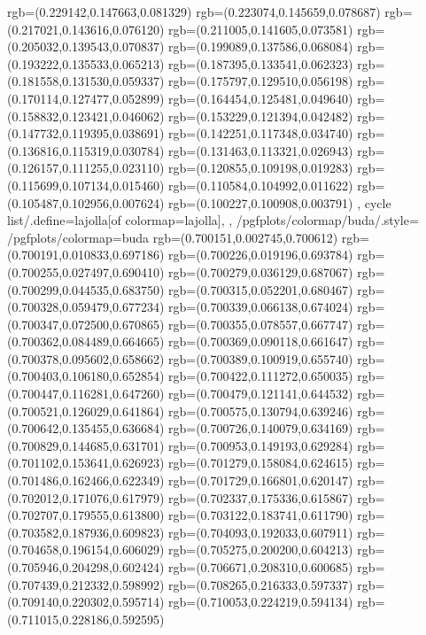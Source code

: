{{{			rgb=(0.229142,0.147663,0.081329)
			rgb=(0.223074,0.145659,0.078687)
			rgb=(0.217021,0.143616,0.076120)
			rgb=(0.211005,0.141605,0.073581)
			rgb=(0.205032,0.139543,0.070837)
			rgb=(0.199089,0.137586,0.068084)
			rgb=(0.193222,0.135533,0.065213)
			rgb=(0.187395,0.133541,0.062323)
			rgb=(0.181558,0.131530,0.059337)
			rgb=(0.175797,0.129510,0.056198)
			rgb=(0.170114,0.127477,0.052899)
			rgb=(0.164454,0.125481,0.049640)
			rgb=(0.158832,0.123421,0.046062)
			rgb=(0.153229,0.121394,0.042482)
			rgb=(0.147732,0.119395,0.038691)
			rgb=(0.142251,0.117348,0.034740)
			rgb=(0.136816,0.115319,0.030784)
			rgb=(0.131463,0.113321,0.026943)
			rgb=(0.126157,0.111255,0.023110)
			rgb=(0.120855,0.109198,0.019283)
			rgb=(0.115699,0.107134,0.015460)
			rgb=(0.110584,0.104992,0.011622)
			rgb=(0.105487,0.102956,0.007624)
			rgb=(0.100227,0.100908,0.003791)
		},
	cycle list/.define={lajolla}{[of colormap=lajolla]},
	},
	/pgfplots/colormap/buda/.style={
		/pgfplots/colormap={buda}{%
			rgb=(0.700151,0.002745,0.700612)
			rgb=(0.700191,0.010833,0.697186)
			rgb=(0.700226,0.019196,0.693784)
			rgb=(0.700255,0.027497,0.690410)
			rgb=(0.700279,0.036129,0.687067)
			rgb=(0.700299,0.044535,0.683750)
			rgb=(0.700315,0.052201,0.680467)
			rgb=(0.700328,0.059479,0.677234)
			rgb=(0.700339,0.066138,0.674024)
			rgb=(0.700347,0.072500,0.670865)
			rgb=(0.700355,0.078557,0.667747)
			rgb=(0.700362,0.084489,0.664665)
			rgb=(0.700369,0.090118,0.661647)
			rgb=(0.700378,0.095602,0.658662)
			rgb=(0.700389,0.100919,0.655740)
			rgb=(0.700403,0.106180,0.652854)
			rgb=(0.700422,0.111272,0.650035)
			rgb=(0.700447,0.116281,0.647260)
			rgb=(0.700479,0.121141,0.644532)
			rgb=(0.700521,0.126029,0.641864)
			rgb=(0.700575,0.130794,0.639246)
			rgb=(0.700642,0.135455,0.636684)
			rgb=(0.700726,0.140079,0.634169)
			rgb=(0.700829,0.144685,0.631701)
			rgb=(0.700953,0.149193,0.629284)
			rgb=(0.701102,0.153641,0.626923)
			rgb=(0.701279,0.158084,0.624615)
			rgb=(0.701486,0.162466,0.622349)
			rgb=(0.701729,0.166801,0.620147)
			rgb=(0.702012,0.171076,0.617979)
			rgb=(0.702337,0.175336,0.615867)
			rgb=(0.702707,0.179555,0.613800)
			rgb=(0.703122,0.183741,0.611790)
			rgb=(0.703582,0.187936,0.609823)
			rgb=(0.704093,0.192033,0.607911)
			rgb=(0.704658,0.196154,0.606029)
			rgb=(0.705275,0.200200,0.604213)
			rgb=(0.705946,0.204298,0.602424)
			rgb=(0.706671,0.208310,0.600685)
			rgb=(0.707439,0.212332,0.598992)
			rgb=(0.708265,0.216333,0.597337)
			rgb=(0.709140,0.220302,0.595714)
			rgb=(0.710053,0.224219,0.594134)
			rgb=(0.711015,0.228186,0.592595)
}}}
